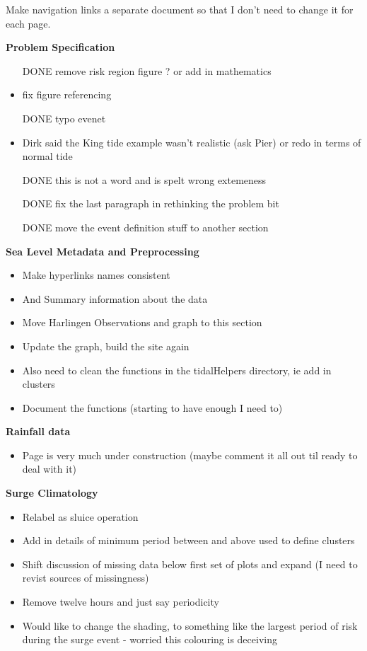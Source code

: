 \documentclass[10pt,a4paper]{article}
\begin{document}
Make navigation links a separate document so that I don't need to change it for each page.

\textbf{Problem Specification}
\begin{itemize}
	\item[DONE] remove risk region figure ? or add in mathematics 
	\item fix figure referencing
	\item [DONE] typo evenet
	\item Dirk said the King tide example wasn't realistic (ask Pier) or redo in terms of normal tide
	\item [DONE] this is not a word and is spelt wrong extemeness
	\item [DONE] fix the last paragraph in rethinking the problem bit
	\item[DONE] move the event definition stuff to another section
\end{itemize}

\textbf{Sea Level Metadata and Preprocessing}
\begin{itemize}
	\item Make hyperlinks names consistent 
	\item And Summary information about the data
	\item Move Harlingen Observations and graph to this section
	\item Update the graph, build the site again 
	\item Also need to clean the functions in the tidalHelpers directory, ie add in clusters
	\item Document the functions (starting to have enough I need to)
\end{itemize}

\textbf{Rainfall data}
\begin{itemize}
	\item Page is very much under construction (maybe comment it all out til ready to deal with it)
\end{itemize}

\textbf{Surge Climatology}
\begin{itemize}
	\item Relabel as sluice operation
	\item Add in details of minimum period between and above used to define clusters
	\item Shift discussion of missing data below first set of plots and expand (I need to revist sources of missingness)
	\item Remove twelve hours and just say periodicity
	\item Would like to change the shading, to something like the largest period of risk during the surge event - worried this colouring is deceiving
\end{itemize}
\end{document}
